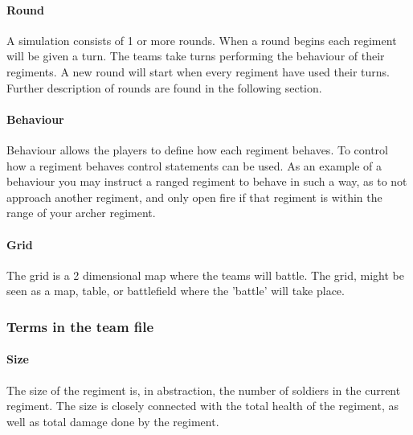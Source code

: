 		\paragraph{Round}
		A simulation consists of 1 or more rounds. When a round begins each regiment will be given a turn.
		The teams take turns performing the behaviour of their regiments. 
		A new round will start when every regiment have used their turns.
		Further description of rounds are found in the following section.

		\paragraph{Behaviour}
		Behaviour allows the players to define how each regiment behaves. 
		To control how a regiment behaves control statements can be used.
		As an example of a behaviour you may instruct a ranged regiment to behave in such a way, 
		as to not approach another regiment, and only open fire if that regiment is within the range of your archer regiment.
				
		\paragraph{Grid}
		The grid is a 2 dimensional map where the teams will battle.
		The grid, might be seen as a map, table, or battlefield where the 'battle' will take place. 
																		
		\subsubsection{Terms in the team file }
	
		\paragraph{Size}
		The size of the regiment is, in abstraction, the number of soldiers in the current regiment. 
		The size is closely connected with the total health of the regiment, as well as total damage done by the regiment.

